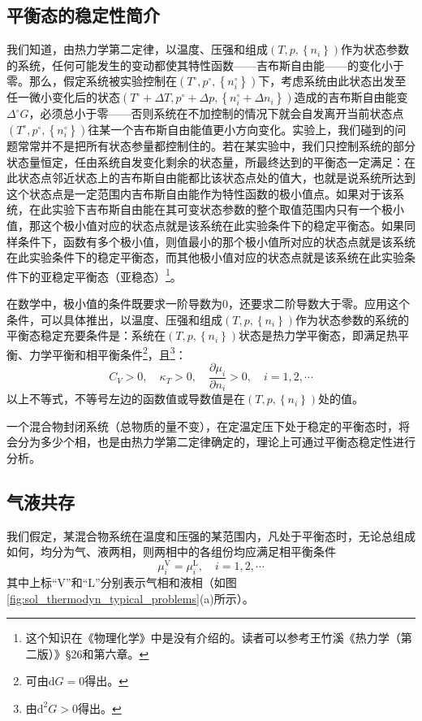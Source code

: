 \documentclass[main.tex]{subfiles}
\begin{document}
\subsection{平衡态的稳定性简介}
我们知道，由热力学第二定律，以温度、压强和组成$\left(T,p,\left\{n_i\right\}\right)$作为状态参数的系统，任何可能发生的变动都使其特性函数——吉布斯自由能——的变化小于零。那么，假定系统被实验控制在$\left(T^\circ,p^\circ,\left\{n_i^\circ\right\}\right)$下，考虑系统由此状态出发至任一微小变化后的状态$\left(T^\circ+\Delta T,p^\circ+\Delta p,\left\{n_i^\circ+\Delta n_i\right\}\right)$造成的吉布斯自由能变$\Delta^\circ G$，必须总小于零——否则系统在不加控制的情况下就会自发离开当前状态点$\left(T^\circ,p^\circ,\left\{n_i^\circ\right\}\right)$往某一个吉布斯自由能值更小方向变化。实验上，我们碰到的问题常常并不是把所有状态参量都控制住的。若在某实验中，我们只控制系统的部分状态量恒定，任由系统自发变化剩余的状态量，所最终达到的平衡态一定满足：在此状态点邻近状态上的吉布斯自由能都比该状态点处的值大，也就是说系统所达到这个状态点是一定范围内吉布斯自由能作为特性函数的极小值点。如果对于该系统，在此实验下吉布斯自由能在其可变状态参数的整个取值范围内只有一个极小值，那这个极小值对应的状态点就是该系统在此实验条件下的稳定平衡态。如果同样条件下，函数有多个极小值，则值最小的那个极小值所对应的状态点就是该系统在此实验条件下的稳定平衡态，而其他极小值对应的状态点就是该系统在此实验条件下的亚稳定平衡态（亚稳态）\footnote{这个知识在《物理化学》中是没有介绍的。读者可以参考王竹溪《热力学（第二版）》\S26和第六章。}。

在数学中，极小值的条件既要求一阶导数为0，还要求二阶导数大于零。应用这个条件，可以具体推出，以温度、压强和组成$\left(T,p,\left\{n_i\right\}\right)$作为状态参数的系统的平衡态稳定充要条件是：系统在$\left(T,p,\left\{n_i\right\}\right)$状态是热力学平衡态，即满足热平衡、力学平衡和相平衡条件\footnote{可由$\mathrm{d}G=0$得出。}，且\footnote{由$\mathrm{d}^2G>0$得出。}：
\[C_V>0,\quad \kappa_T>0,\quad \frac{\partial \mu_i}{\partial n_i}>0,\quad i=1,2,\cdots\]
以上不等式，不等号左边的函数值或导数值是在$\left(T,p,\left\{n_i\right\}\right)$处的值。

一个混合物封闭系统（总物质的量不变），在定温定压下处于稳定的平衡态时，将会分为多少个相，也是由热力学第二定律确定的，理论上可通过平衡态稳定性进行分析。

\subsection{气液共存}\label{sec:II.5.2 vapor-liquid_equilibrium}
我们假定，某混合物系统在温度和压强的某范围内，凡处于平衡态时，无论总组成如何，均分为气、液两相，则两相中的各组份均应满足相平衡条件
\[\mu_i^\text{V}=\mu_i^\text{L},\quad i=1,2,\cdots\]
其中上标“V”和“L”分别表示气相和液相（如图\ref{fig:sol_thermodyn_typical_problems}(a)所示）。
\end{document}
